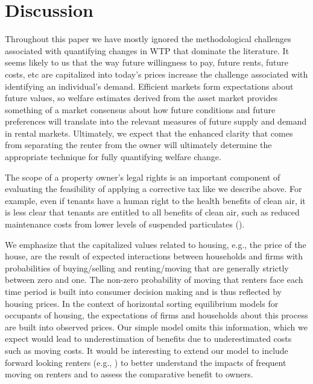 \documentclass[ecta,nameyear,draft]{econsocart}
\theoremstyle{plain}
\theoremstyle{remark}
\begin{document}
\section{Discussion}
Throughout this paper we have mostly ignored the methodological challenges associated with quantifying changes in WTP that dominate the literature. It seems likely to us that the way future willingness to pay, future rents, future costs, etc are capitalized into today's prices increase the challenge associated with identifying an individual's demand. Efficient markets form expectations about future values, so welfare estimates derived from the asset market provides something of a market consensus about how future conditions and future preferences will translate into the relevant measures of future supply and demand in rental markets. Ultimately, we expect that the enhanced clarity that comes from separating the renter from the owner will ultimately determine the appropriate technique for fully quantifying welfare change.

The scope of a property owner's legal rights is an important component of evaluating the feasibility of applying a corrective tax like we describe above. For example, even if tenants have a human right to the health benefits of clean air, it is less clear that tenants are entitled to all benefits of clean air, such as reduced maintenance costs from lower levels of suspended particulates (\cite{bajari12}). 

We emphasize that the capitalized values related to housing, e.g., the price of the house, are the result of expected interactions between households and firms with probabilities of buying/selling and renting/moving that are generally strictly between zero and one. The non-zero probability of moving that renters face each time period is built into consumer decision making and is thus reflected by housing prices. In the context of horizontal sorting equilibrium models for occupants of housing, the expectations of firms and households about this process are built into observed prices. Our simple model omits this information, which we expect would lead to underestimation of benefits due to underestimated costs such as moving costs. It would be interesting to extend our model to include forward looking renters (e.g., \cite{bishop19}) to better understand the impacts of frequent moving on renters and to assess the comparative benefit to owners.  
\end{document}
